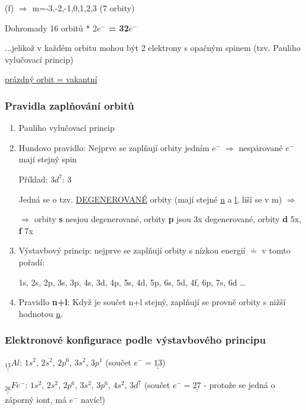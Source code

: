    (f) $\Rightarrow$ m=-3,-2,-1,0,1,2,3 (7 orbity)

\medskip
Dohromady 16 orbitů * 2$e^-$ \textbf{= 32$e^-$}

...jelikož v každém orbitu mohou být 2 elektrony s opačným spinem (tzv. Pauliho vylučovací princip)

\bigskip
\fbox{\phantom{$\uparrow$ }} \underline{prázdný orbit = vakantní}

\subsubsection{Pravidla zaplňování orbitů}
\begin{enumerate}
    \item Pauliho vylučovací princip
    \item Hundovo pravidlo: Nejprve se zaplňují orbity jedním $e^- \; \Rightarrow$ nespárované $e^-$ mají stejný spin
    
    Příklad: $3d^7$: 3 \fbox{$\downarrow\textcolor{magenta}{\uparrow}$}\fbox{$\downarrow\textcolor{magenta}{\uparrow}$}\fbox{$\downarrow\textcolor{magenta}{.}$}\fbox{$\downarrow\textcolor{magenta}{.}$}\fbox{$\downarrow\textcolor{magenta}{.}$}
    
    Jedná se o tzv. \underline{DEGENEROVANÉ} orbity (mají stejné \underline{n} a \underline{l}, liší se v m) $\Rightarrow$
    
    $\Rightarrow$ orbity \textbf{s} nesjou degenerované, orbity \textbf{p} jsou 3x degenerované, orbity \textbf{d} 5x, \textbf{f} 7x
    \item Výstavbový princip: nejprve se zaplňují orbity s nízkou energií $\doteq$ v tomto pořadí:
    
    1s, 2s, 2p, 3s, 3p, 4s, 3d, 4p, 5s, 4d, 5p, 6s, 5d, 4f, 6p, 7s, 6d \dots
    \item Pravidlo \textbf{n+l}: Když je součet n+l stejný, zaplňují se provně orbity s nižší hodnotou \underline{n}.
\end{enumerate}

\subsubsection{Elektronové konfigurace podle výstavbového principu}
$\underline{\underline{_{13}}}Al$: $1s^2$, $2s^2$, $2p^6$, $3s^2$, $3p^1$ (součet $e^- = \underline{\underline{13}}$)

$\underline{\underline{_{26}}}Fe^-$: $1s^2$, $2s^2$, $2p^6$, $3s^2$, $3p^6$, $4s^2$, $3d^{\underline{7}}$ (součet $e^- = \underline{\underline{27}}$ - protože se jedná o záporný iont, má $e^-$ navíc!)


